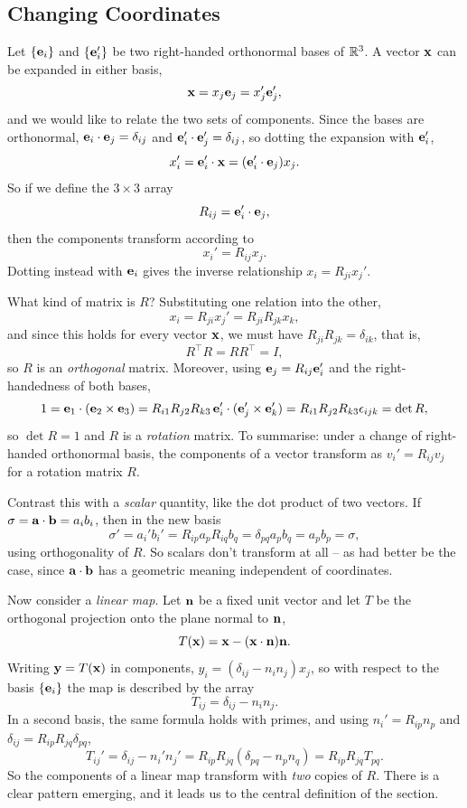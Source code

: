 \documentclass[a4paper]{scrartcl}
\begin{document}
\subsection{Changing Coordinates}

Let $\{\mathbf{e}_i\}$ and $\{\mathbf{e}_i'\}$ be two right-handed orthonormal bases of $\mathbb{R}^3$. A vector $\mathbf{x}$ can be expanded in either basis,
$$
\mathbf{x} = x_j \mathbf{e}_j = x_j' \mathbf{e}_j',
$$
and we would like to relate the two sets of components. Since the bases are orthonormal, $\mathbf{e}_i \cdot \mathbf{e}_j = \delta_{ij}$ and $\mathbf{e}_i' \cdot \mathbf{e}_j' = \delta_{ij}$, so dotting the expansion with $\mathbf{e}_i'$,
$$
x_i' = \mathbf{e}_i' \cdot \mathbf{x} = (\mathbf{e}_i' \cdot \mathbf{e}_j) x_j.
$$
So if we define the $3 \times 3$ array
$$
R_{ij} = \mathbf{e}_i' \cdot \mathbf{e}_j,
$$
then the components transform according to
$$
x_i' = R_{ij} x_j.
$$
Dotting instead with $\mathbf{e}_i$ gives the inverse relationship $x_i = R_{ji} x_j'$.

What kind of matrix is $R$? Substituting one relation into the other,
$$
x_i = R_{ji} x_j' = R_{ji} R_{jk} x_k,
$$
and since this holds for every vector $\mathbf{x}$, we must have $R_{ji}R_{jk} = \delta_{ik}$, that is,
$$
R^\top R = R R^\top = I,
$$
so $R$ is an \emph{orthogonal} matrix. Moreover, using $\mathbf{e}_j = R_{ij}\mathbf{e}_i'$ and the right-handedness of both bases,
$$
1 = \mathbf{e}_1 \cdot (\mathbf{e}_2 \times \mathbf{e}_3) = R_{i1}R_{j2}R_{k3} \, \mathbf{e}_i' \cdot (\mathbf{e}_j' \times \mathbf{e}_k') = R_{i1}R_{j2}R_{k3} \epsilon_{ijk} = \det R,
$$
so $\det R = 1$ and $R$ is a \emph{rotation} matrix. To summarise: under a change of right-handed orthonormal basis, the components of a vector transform as $v_i' = R_{ij} v_j$ for a rotation matrix $R$.

Contrast this with a \emph{scalar} quantity, like the dot product of two vectors. If $\sigma = \mathbf{a} \cdot \mathbf{b} = a_i b_i$, then in the new basis
$$
\sigma' = a_i' b_i' = R_{ip} a_p R_{iq} b_q = \delta_{pq} a_p b_q = a_p b_p = \sigma,
$$
using orthogonality of $R$. So scalars don't transform at all -- as had better be the case, since $\mathbf{a} \cdot \mathbf{b}$ has a geometric meaning independent of coordinates.

Now consider a \emph{linear map}. Let $\mathbf{n}$ be a fixed unit vector and let $T$ be the orthogonal projection onto the plane normal to $\mathbf{n}$,
$$
T(\mathbf{x}) = \mathbf{x} - (\mathbf{x} \cdot \mathbf{n}) \mathbf{n}.
$$
Writing $\mathbf{y} = T(\mathbf{x})$ in components, $y_i = (\delta_{ij} - n_i n_j) x_j$, so with respect to the basis $\{\mathbf{e}_i\}$ the map is described by the array
$$
T_{ij} = \delta_{ij} - n_i n_j.
$$
In a second basis, the same formula holds with primes, and using $n_i' = R_{ip} n_p$ and $\delta_{ij} = R_{ip}R_{jq}\delta_{pq}$,
$$
T_{ij}' = \delta_{ij} - n_i' n_j' = R_{ip} R_{jq} (\delta_{pq} - n_p n_q) = R_{ip} R_{jq} T_{pq}.
$$
So the components of a linear map transform with \emph{two} copies of $R$. There is a clear pattern emerging, and it leads us to the central definition of the section.
\end{document}
